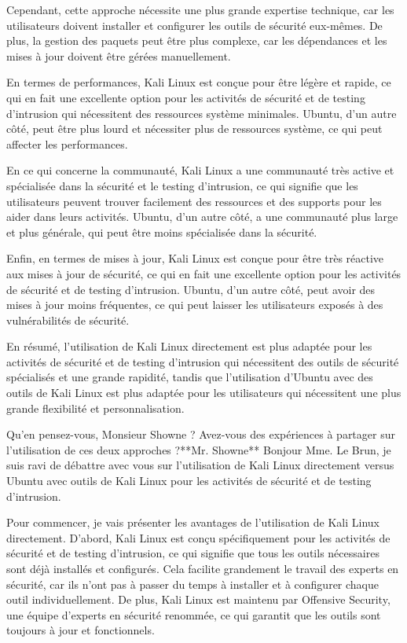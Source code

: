 Cependant, cette approche nécessite une plus grande expertise technique, car les utilisateurs doivent installer et configurer les outils de sécurité eux-mêmes. De plus, la gestion des paquets peut être plus complexe, car les dépendances et les mises à jour doivent être gérées manuellement.

En termes de performances, Kali Linux est conçue pour être légère et rapide, ce qui en fait une excellente option pour les activités de sécurité et de testing d'intrusion qui nécessitent des ressources système minimales. Ubuntu, d'un autre côté, peut être plus lourd et nécessiter plus de ressources système, ce qui peut affecter les performances.

En ce qui concerne la communauté, Kali Linux a une communauté très active et spécialisée dans la sécurité et le testing d'intrusion, ce qui signifie que les utilisateurs peuvent trouver facilement des ressources et des supports pour les aider dans leurs activités. Ubuntu, d'un autre côté, a une communauté plus large et plus générale, qui peut être moins spécialisée dans la sécurité.

Enfin, en termes de mises à jour, Kali Linux est conçue pour être très réactive aux mises à jour de sécurité, ce qui en fait une excellente option pour les activités de sécurité et de testing d'intrusion. Ubuntu, d'un autre côté, peut avoir des mises à jour moins fréquentes, ce qui peut laisser les utilisateurs exposés à des vulnérabilités de sécurité.

En résumé, l'utilisation de Kali Linux directement est plus adaptée pour les activités de sécurité et de testing d'intrusion qui nécessitent des outils de sécurité spécialisés et une grande rapidité, tandis que l'utilisation d'Ubuntu avec des outils de Kali Linux est plus adaptée pour les utilisateurs qui nécessitent une plus grande flexibilité et personnalisation.

Qu'en pensez-vous, Monsieur Showne ? Avez-vous des expériences à partager sur l'utilisation de ces deux approches ?**Mr. Showne**
Bonjour Mme. Le Brun, je suis ravi de débattre avec vous sur l'utilisation de Kali Linux directement versus Ubuntu avec outils de Kali Linux pour les activités de sécurité et de testing d'intrusion.

Pour commencer, je vais présenter les avantages de l'utilisation de Kali Linux directement. D'abord, Kali Linux est conçu spécifiquement pour les activités de sécurité et de testing d'intrusion, ce qui signifie que tous les outils nécessaires sont déjà installés et configurés. Cela facilite grandement le travail des experts en sécurité, car ils n'ont pas à passer du temps à installer et à configurer chaque outil individuellement. De plus, Kali Linux est maintenu par Offensive Security, une équipe d'experts en sécurité renommée, ce qui garantit que les outils sont toujours à jour et fonctionnels.

